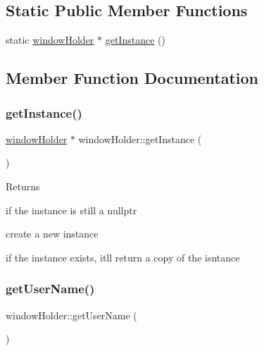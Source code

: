 \subsection*{Static Public Member Functions}
\begin{DoxyCompactItemize}
\item 
static \hyperlink{classwindow_holder}{window\+Holder} $\ast$ \hyperlink{classwindow_holder_ae64d5ca66adacd67952c0d4d45dc6409}{get\+Instance} ()
\end{DoxyCompactItemize}


\subsection{Member Function Documentation}
\mbox{\label{classwindow_holder_ae64d5ca66adacd67952c0d4d45dc6409}} 
\subsubsection{\texorpdfstring{get\+Instance()}{getInstance()}}
{\footnotesize\ttfamily \hyperlink{classwindow_holder}{window\+Holder} $\ast$ window\+Holder\+::get\+Instance (\begin{DoxyParamCaption}{ }\end{DoxyParamCaption})\hspace{0.3cm}{\ttfamily [static]}}

\begin{DoxyReturn}{Returns}

\end{DoxyReturn}
if the instance is still a nullptr

create a new instance

if the instance exists, it\textquotesingle{}ll return a copy of the isntance \mbox{\label{classwindow_holder_a2acbd88adbc48d8e9aef05ce5a692239}} 
\subsubsection{\texorpdfstring{get\+User\+Name()}{getUserName()}}
{\footnotesize\ttfamily window\+Holder\+::get\+User\+Name (\begin{DoxyParamCaption}{ }\end{DoxyParamCaption})\hspace{0.3cm}{\ttfamily [inline]}}

